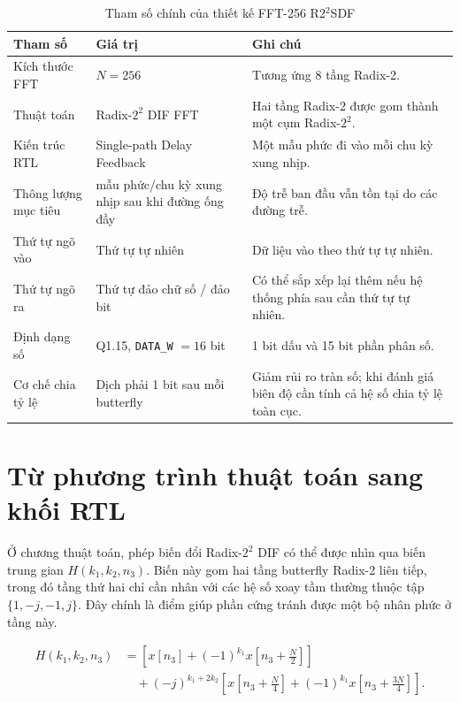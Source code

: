 \documentclass[12pt,a4paper]{report}
\numberwithin{equation}{chapter}
\begin{document}
\begin{table}[H]
    \centering
    \caption{Tham số chính của thiết kế FFT-256 R2$^2$SDF}
    \label{tab:r22rtl_design_params}
    \begin{tabularx}{\textwidth}{>{\raggedright\arraybackslash}p{3.2cm}>{\raggedright\arraybackslash}p{4.2cm}X}
        \toprule
        \textbf{Tham số} & \textbf{Giá trị} & \textbf{Ghi chú} \\
        \midrule
        Kích thước FFT & $N=256$ & Tương ứng 8 tầng Radix-2. \\
        Thuật toán & Radix-$2^2$ DIF FFT & Hai tầng Radix-2 được gom thành một cụm Radix-$2^2$. \\
        Kiến trúc RTL & Single-path Delay Feedback & Một mẫu phức đi vào mỗi chu kỳ xung nhịp. \\
        Thông lượng mục tiêu & 1 mẫu phức/chu kỳ xung nhịp sau khi đường ống đầy & Độ trễ ban đầu vẫn tồn tại do các đường trễ. \\
        Thứ tự ngõ vào & Thứ tự tự nhiên & Dữ liệu vào theo thứ tự tự nhiên. \\
        Thứ tự ngõ ra & Thứ tự đảo chữ số / đảo bit & Có thể sắp xếp lại thêm nếu hệ thống phía sau cần thứ tự tự nhiên. \\
        Định dạng số & Q1.15, \texttt{DATA\_W} $=16$ bit & 1 bit dấu và 15 bit phần phân số. \\
        Cơ chế chia tỷ lệ & Dịch phải 1 bit sau mỗi butterfly & Giảm rủi ro tràn số; khi đánh giá biên độ cần tính cả hệ số chia tỷ lệ toàn cục. \\
        \bottomrule
    \end{tabularx}
\end{table}

\section{Từ phương trình thuật toán sang khối RTL}
\label{sec:r22rtl_equation_to_rtl}

Ở chương thuật toán, phép biến đổi Radix-$2^2$ DIF có thể được nhìn qua biến trung gian $H(k_1,k_2,n_3)$. Biến này gom hai tầng butterfly Radix-2 liên tiếp, trong đó tầng thứ hai chỉ cần nhân với các hệ số xoay tầm thường thuộc tập $\{1,-j,-1,j\}$. Đây chính là điểm giúp phần cứng tránh được một bộ nhân phức ở tầng này.

\begin{equation}
\begin{aligned}
    H(k_1,k_2,n_3)
    &=\left[x[n_3]+(-1)^{k_1}x\!\left[n_3+\frac{N}{2}\right]\right] \\
    &\quad +(-j)^{k_1+2k_2}
    \left[x\!\left[n_3+\frac{N}{4}\right]+(-1)^{k_1}x\!\left[n_3+\frac{3N}{4}\right]\right].
\end{aligned}
\label{eq:r22rtl_h_equation}
\end{equation}
\end{document}
